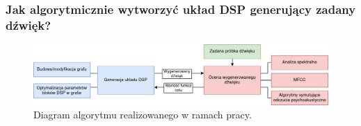 \documentclass[]{beamer}
\begin{document}




\begin{frame}
  \frametitle{Jak algorytmicznie wytworzyć układ DSP generujący zadany dźwięk?}

  \begin{figure}
    \centering
    \includegraphics[width=1.0\linewidth]{algorithm-diagram.png}
    \caption{Diagram algorytmu realizowanego w ramach pracy.}
  \end{figure}
\end{frame}
\end{document}
